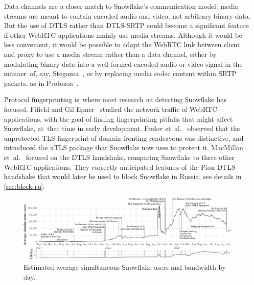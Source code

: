 \documentclass[letterpaper,twocolumn]{article}
\begin{document}
\begin{description}
Data channels are a closer match to Snowflake's communication model:
media streams are meant to contain encoded audio and video,
not arbitrary binary data.
But the use of DTLS rather than DTLS-SRTP could become
a significant feature if other WebRTC applications mainly use media streams.
Although it would be less convenient,
it would be possible to adapt the WebRTC link between
client and proxy
to use a media stream rather than a data channel,
either by modulating binary data into a well-formed encoded
audio or video signal in the manner~of, say,
Stegozoa~\cite[\S 3.3]{Figueira2022a},
or by replacing media codec content within SRTP packets,
as in Protozoa~\cite[\S 4.4]{Barradas2020a}.

\end{description}

Protocol fingerprinting
is~where most research on detecting Snowflake has focused.
Fifield and Gil Epner~\cite{arxiv.1605.08805}
studied the network traffic of WebRTC applications,
with the goal of finding fingerprinting pitfalls
that might affect Snowflake, at~that time in early development.
Frolov et~al.~\cite[\S \mbox{V-C}]{Frolov2019a}
observed that the unprotected TLS fingerprint
of domain fronting rendezvous was distinctive,
and introduced the uTLS package that Snowflake
now uses to protect it.
MacMillan et~al.~\cite{arxiv.2008.03254}
focused on the DTLS handshake,
comparing Snowflake to three other WebRTC applications.
They correctly anticipated features
of the Pion DTLS handshake
that would later be used
to block Snowflake in Russia;
see details in \autoref{sec:block-ru}.

\begin{figure}[t]
\includegraphics{figures/users/users-global}
\caption{
Estimated average simultaneous Snowflake users and bandwidth by day.
}
\label{fig:client-counts}
\end{figure}
\end{document}
